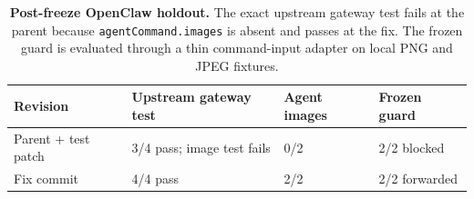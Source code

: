 \begin{table}[H]
\centering
\scriptsize
\setlength{\tabcolsep}{2.2pt}
\caption{\textbf{Post-freeze OpenClaw holdout.} The exact upstream gateway test fails at the parent because \texttt{agentCommand.images} is absent and passes at the fix. The frozen guard is evaluated through a thin command-input adapter on local PNG and JPEG fixtures.}
\label{tab:openclaw-holdout}
\begin{tabular}{@{}p{.22\linewidth}p{.22\linewidth}p{.23\linewidth}p{.23\linewidth}@{}}
\toprule
Revision & Upstream gateway test & Agent images & Frozen guard \\
\midrule
Parent + test patch & 3/4 pass; image test fails & 0/2 & 2/2 blocked \\
Fix commit & 4/4 pass & 2/2 & 2/2 forwarded \\
\bottomrule
\end{tabular}
\end{table}
